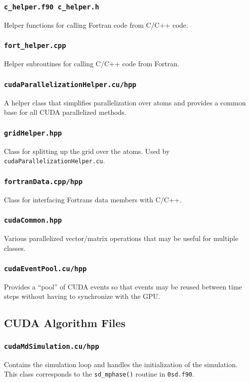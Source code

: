 \documentclass{article}
\begin{document}
\subsubsection{\texttt{c\_helper.f90 c\_helper.h}}
Helper functions for calling Fortran code from C/C++ code.

\subsubsection{\texttt{fort\_helper.cpp}}
Helper subroutines for calling C/C++ code from Fortran.

\subsubsection{\texttt{cudaParallelizationHelper.cu/hpp}}
A helper class that simplifies parallelization over atoms and provides a common base for all CUDA parallelized methods.

\subsubsection{\texttt{gridHelper.hpp}}
Class for splitting up the grid over the atoms. Used by \verb|cudaParallelizationHelper.cu|.

\subsubsection{\texttt{fortranData.cpp/hpp}}
Class for interfacing Fortrans data members with C/C++.

\subsubsection{\texttt{cudaCommon.hpp}}
Various parallelized vector/matrix operations that may be useful for multiple classes.

\subsubsection{\texttt{cudaEventPool.cu/hpp}}
Provides a ``pool'' of CUDA events so that events may be reused between time steps without having to synchronize with the GPU.


\subsection{CUDA Algorithm Files}

\subsubsection{\texttt{cudaMdSimulation.cu/hpp}}
Contains the simulation loop and handles the initialization of the simulation. This class corresponds to the \verb|sd_mphase()| routine in \verb|0sd.f90|.
\end{document}

